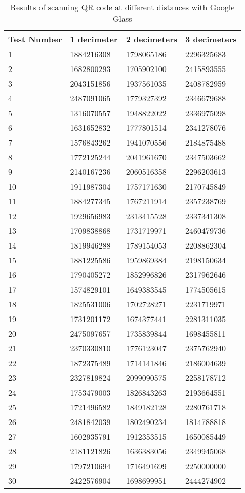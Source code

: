 	\begin{table}[ht!]
    		\caption{Results of scanning QR code at different distances with Google Glass} \label{tab:distamceSmartphoneFull}
		\centering \begin{tabularx}{\textwidth}{l|X|X|X} \hline
		\textbf{Test Number} & \textbf{1 decimeter} & \textbf{2 decimeters} & \textbf{3 decimeters} \\ \hline \hline
       
		1&	1884216308	&	1798065186	&	2296325683	\\ \hline
		2&	1682800293	&	1705902100	&	2415893555	\\ \hline
		3&	2043151856	&	1937561035	&	2408782959	\\ \hline
		4&	2487091065	&	1779327392	&	2346679688	\\ \hline
		5&	1316070557	&	1948822022	&	2336975098	\\ \hline
		6&	1631652832	&	1777801514	&	2341278076	\\ \hline
		7&	1576843262	&	1941070556	&	2184875488	\\ \hline
		8&	1772125244	&	2041961670	&	2347503662	\\ \hline
		9&	2140167236	&	2060516358	&	2296203613	\\ \hline
		10&	1911987304	&	1757171630	&	2170745849	\\ \hline
		11&	1884277345	&	1767211914	&	2357238769	\\ \hline
		12&	1929656983	&	2313415528	&	2337341308	\\ \hline
		13&	1709838868	&	1731719971	&	2460479736	\\ \hline
		14&	1819946288	&	1789154053	&	2208862304	\\ \hline
		15&	1881225586	&	1959869384	&	2198150634	\\ \hline
		16&	1790405272	&	1852996826	&	2317962646	\\ \hline
		17&	1574829101	&	1649383545	&	1774505615	\\ \hline
		18&	1825531006	&	1702728271	&	2231719971	\\ \hline
		19&	1731201172	&	1674377441	&	2281311035	\\ \hline
		20&	2475097657	&	1735839844	&	1698455811	\\ \hline
		21&	2370330810	&	1776123047	&	2375762940	\\ \hline
		22&	1872375489	&	1714141846	&	2186004639	\\ \hline
		23&	2327819824	&	2099090575	&	2258178712	\\ \hline
		24&	1753479003	&	1826843263	&	2193664551	\\ \hline
		25&	1721496582	&	1849182128	&	2280761718	\\ \hline
		26&	2481842039	&	1802490234	&	1814788818	\\ \hline
		27&	1602935791	&	1912353515	&	1650085449	\\ \hline
		28&	2181121826	&	1636383056	&	2349945068	\\ \hline
		29&	1797210694	&	1716491699	&	2250000000	\\ \hline
		30&	2422576904	&	1698699951	&	2444274902	\\ \hline


\end{tabularx}
\end{table}

